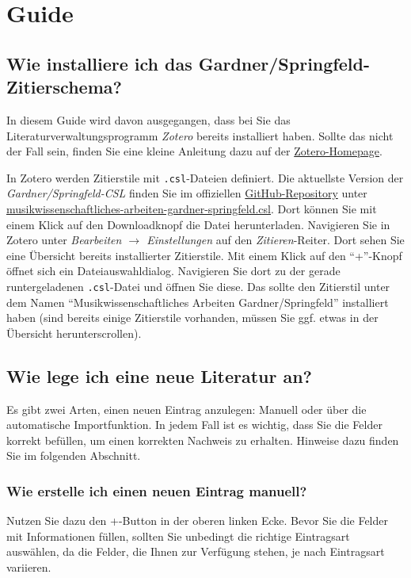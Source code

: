 \section{Guide}\label{guide}
\subsection{Wie installiere ich das Gardner/Springfeld-Zitierschema?}
In diesem Guide wird davon ausgegangen, dass bei Sie das Literaturverwaltungsprogramm \textit{Zotero} bereits installiert haben. Sollte das nicht der Fall sein, finden Sie eine kleine Anleitung dazu auf der \href{https://www.zotero.org/support/installation}{Zotero-Homepage}.

In Zotero werden Zitierstile mit \texttt{.csl}-Dateien definiert.
Die aktuellste Version der \textit{Gardner/Springfeld-CSL} finden Sie im offiziellen \href{https://github.com/digimuwi/MWA_csl}{GitHub-Re\-po\-si\-to\-ry}
unter
\href{https://github.com/digimuwi/MWA_csl/blob/main/musikwissenschaftliches-arbeiten-gardner-springfeld.csl}{musik\-wissen\-schaft\-liches-ar\-bei\-ten-gard\-ner-spring\-feld.csl}.
Dort k\"onnen Sie mit einem Klick auf den Downloadknopf die Datei herunterladen.
Navigieren Sie in Zotero unter \textit{Bearbeiten $\rightarrow$ Einstellungen} auf den \textit{Zitieren}-Reiter.
Dort sehen Sie eine \"Ubersicht bereits installierter Zitierstile. Mit einem Klick auf den "`+"'-Knopf \"offnet sich ein Dateiauswahldialog.
Navigieren Sie dort zu der gerade runtergeladenen \texttt{.csl}-Datei und \"offnen Sie diese.
Das sollte den Zitierstil unter dem Namen "`Musikwissenschaftliches Arbeiten Gardner/Springfeld"' installiert haben (sind bereits einige Zitierstile vorhanden, m\"ussen Sie ggf. etwas in der \"Ubersicht herunterscrollen).
\newpage

\subsection{Wie lege ich eine neue Literatur an?}
Es gibt zwei Arten, einen neuen Eintrag anzulegen: Manuell oder über die 
automatische Importfunktion. In jedem Fall ist es wichtig, dass Sie
die Felder korrekt befüllen, um einen korrekten Nachweis zu erhalten. Hinweise 
dazu finden Sie im folgenden Abschnitt.

\subsubsection{Wie erstelle ich einen neuen Eintrag manuell?}
Nutzen Sie dazu den +-Button in der oberen linken Ecke. Bevor Sie die 
Felder mit Informationen füllen, sollten Sie unbedingt die richtige 
Eintragsart auswählen, da die Felder, die Ihnen zur Verfügung stehen, 
je nach Eintragsart variieren.

